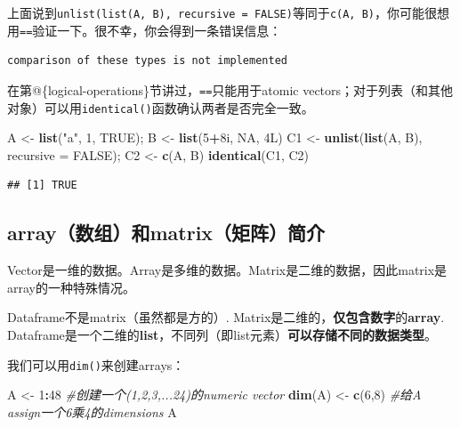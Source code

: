 \documentclass[]{book}
\newenvironment{Shaded}{\begin{snugshade}}{\end{snugshade}}
\newcommand{\CommentTok}[1]{\textcolor[rgb]{0.56,0.35,0.01}{\textit{#1}}}
\newcommand{\DataTypeTok}[1]{\textcolor[rgb]{0.13,0.29,0.53}{#1}}
\newcommand{\DecValTok}[1]{\textcolor[rgb]{0.00,0.00,0.81}{#1}}
\newcommand{\KeywordTok}[1]{\textcolor[rgb]{0.13,0.29,0.53}{\textbf{#1}}}
\newcommand{\NormalTok}[1]{#1}
\newcommand{\OperatorTok}[1]{\textcolor[rgb]{0.81,0.36,0.00}{\textbf{#1}}}
\newcommand{\OtherTok}[1]{\textcolor[rgb]{0.56,0.35,0.01}{#1}}
\newcommand{\StringTok}[1]{\textcolor[rgb]{0.31,0.60,0.02}{#1}}
\begin{document}
上面说到\texttt{unlist(list(A,\ B),\ recursive\ =\ FALSE)}等同于\texttt{c(A,\ B)}，你可能很想用\texttt{==}验证一下。很不幸，你会得到一条错误信息：

\begin{verbatim}
comparison of these types is not implemented
\end{verbatim}

在第@\{logical-operations\}节讲过，\texttt{==}只能用于atomic vectors；对于列表（和其他对象）可以用\texttt{identical()}函数确认两者是否完全一致。

\begin{Shaded}
\begin{Highlighting}[]
\NormalTok{A <-}\StringTok{ }\KeywordTok{list}\NormalTok{(}\StringTok{"a"}\NormalTok{, }\DecValTok{1}\NormalTok{, }\OtherTok{TRUE}\NormalTok{); B <-}\StringTok{ }\KeywordTok{list}\NormalTok{(}\DecValTok{5}\OperatorTok{+}\NormalTok{8i, }\OtherTok{NA}\NormalTok{, 4L)}
\NormalTok{C1 <-}\StringTok{ }\KeywordTok{unlist}\NormalTok{(}\KeywordTok{list}\NormalTok{(A, B), }\DataTypeTok{recursive =} \OtherTok{FALSE}\NormalTok{); C2 <-}\StringTok{ }\KeywordTok{c}\NormalTok{(A, B)}
\KeywordTok{identical}\NormalTok{(C1, C2)}
\end{Highlighting}
\end{Shaded}

\begin{verbatim}
## [1] TRUE
\end{verbatim}

\hypertarget{matrix-array}{%
\subsection{array（数组）和matrix（矩阵）简介}\label{matrix-array}}

Vector是一维的数据。Array是多维的数据。Matrix是二维的数据，因此matrix是array的一种特殊情况。

Dataframe不是matrix（虽然都是方的）. Matrix是二维的，\textbf{仅包含数字}的\textbf{array}. Dataframe是一个二维的\textbf{list}，不同列（即list元素）\textbf{可以存储不同的数据类型}。

我们可以用\texttt{dim()}来创建arrays：

\begin{Shaded}
\begin{Highlighting}[]
\NormalTok{A <-}\StringTok{ }\DecValTok{1}\OperatorTok{:}\DecValTok{48} \CommentTok{#创建一个(1,2,3,...24)的numeric vector}
\KeywordTok{dim}\NormalTok{(A) <-}\StringTok{ }\KeywordTok{c}\NormalTok{(}\DecValTok{6}\NormalTok{,}\DecValTok{8}\NormalTok{) }\CommentTok{#给A assign一个6乘4的dimensions}
\NormalTok{A}
\end{Highlighting}
\end{Shaded}
\end{document}
